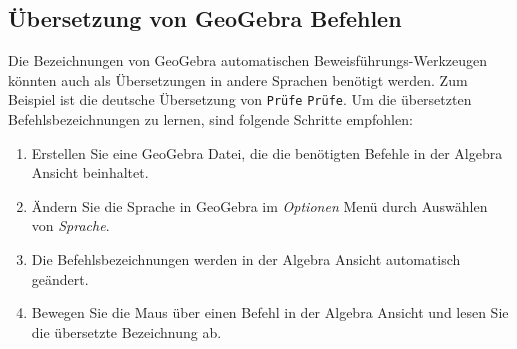 \documentclass{article}
\begin{document}
\subsection{Übersetzung von GeoGebra Befehlen}

Die Bezeichnungen von GeoGebra automatischen Beweisführungs-Werkzeugen könnten auch als Übersetzungen in andere Sprachen benötigt werden. Zum Beispiel ist die deutsche Übersetzung von \texttt{Prüfe}  \texttt{Pr\"ufe}.
Um die übersetzten Befehlsbezeichnungen zu lernen, sind folgende Schritte empfohlen:

\begin{enumerate}
\item Erstellen Sie eine GeoGebra Datei, die die benötigten Befehle in der Algebra Ansicht beinhaltet.
\item Ändern Sie die Sprache in GeoGebra im \textit{Optionen} Menü durch Auswählen von \textit{Sprache}.
\item Die Befehlsbezeichnungen werden in der Algebra Ansicht automatisch geändert.
\item Bewegen Sie die Maus über einen Befehl in der Algebra Ansicht und lesen Sie die übersetzte Bezeichnung ab.
\end{enumerate}


\end{document}
